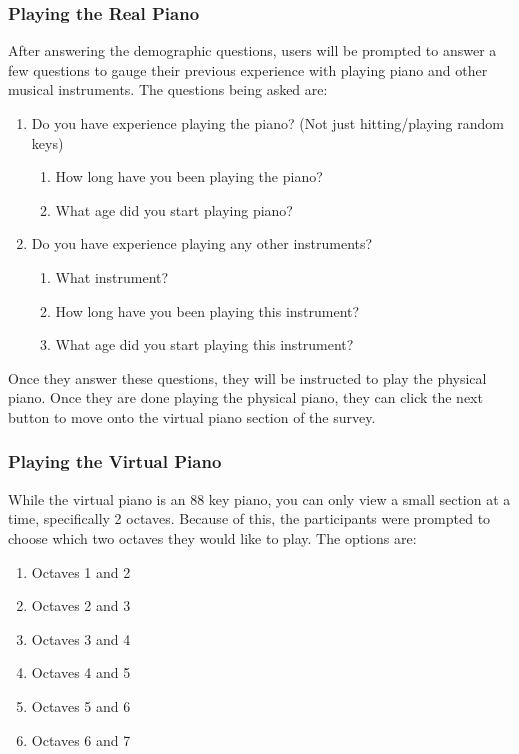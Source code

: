 \documentclass[sigconf,authordraft]{acmart}
\begin{document}
\subsubsection{Playing the Real Piano}
After answering the demographic questions, users will be prompted to answer a few questions to gauge their previous experience with playing piano and other musical instruments.  The questions being asked are:
\begin{enumerate}
 \item Do you have experience playing the piano? (Not just hitting/playing random keys)
 \begin{enumerate}
 \item How long have you been playing the piano?
 \item What age did you start playing piano?
 \end{enumerate}
 \item Do you have experience playing any other instruments?
 \begin{enumerate}
 \item What instrument?
 \item How long have you been playing this instrument?
 \item What age did you start playing this instrument?
 \end{enumerate}
\end{enumerate}

Once they answer these questions, they will be instructed to play the physical piano.  Once they are done playing the physical piano, they can click the next button to move onto the virtual piano section of the survey.
\subsubsection{Playing the Virtual Piano}
While the virtual piano is an 88 key piano, you can only view a small section at a time, specifically 2 octaves.  Because of this, the participants were prompted to choose which two octaves they would like to play.  The options are:
\begin{enumerate}
 \item Octaves 1 and 2
 \item Octaves 2 and 3
 \item Octaves 3 and 4
 \item Octaves 4 and 5
 \item Octaves 5 and 6
 \item Octaves 6 and 7
 \end{enumerate}
\end{document}
